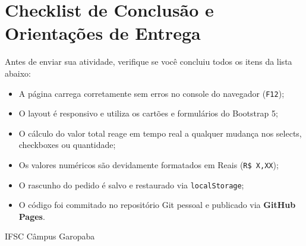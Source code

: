 \section{Checklist de Conclusão e Orientações de Entrega}\label{sec:m4a}

Antes de enviar sua atividade, verifique se você concluiu todos os itens da lista abaixo:

\begin{checklist}
\begin{itemize}
\item[\caixaMarcar] A página carrega corretamente sem erros no console do navegador (\texttt{F12});
\item[\caixaMarcar] O layout é responsivo e utiliza os cartões e formulários do Bootstrap 5;
\item[\caixaMarcar] O cálculo do valor total reage em tempo real a qualquer mudança nos selects, checkboxes ou quantidade;
\item[\caixaMarcar] Os valores numéricos são devidamente formatados em Reais (\texttt{R\$ X,XX});
\item[\caixaMarcar] O rascunho do pedido é salvo e restaurado via \texttt{localStorage};
\item[\caixaMarcar] O código foi commitado no repositório Git pessoal e publicado via \textbf{GitHub Pages}.
\end{itemize}
\end{checklist}

\vfill
{\centering\footnotesize\color{suave}\faMapMarkerAlt\hspace{0.4em}IFSC Câmpus Garopaba\par}
